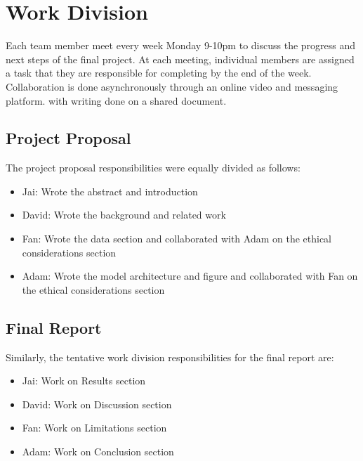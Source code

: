 \documentclass[../main.tex]{subfiles}
\begin{document}
\section{Work Division} 
Each team member meet every week Monday 9-10pm to 
discuss the progress and next steps of the final project. At each meeting, 
individual members are assigned a task that they are responsible for completing 
by the end of the week. Collaboration is done asynchronously through an online 
video and messaging platform. with writing done on a shared document.

\subsection{Project Proposal} 
The project proposal responsibilities were equally divided as follows:

\begin{itemize} 
  \item Jai: Wrote the abstract and introduction 
  \item David: Wrote the background and related work 
  \item Fan: Wrote the data section and collaborated with Adam on the ethical considerations section
  \item Adam: Wrote the model architecture and figure and collaborated with Fan on the ethical considerations section
\end{itemize}

\subsection{Final Report} 

Similarly, the tentative work division responsibilities for the final report are:

\begin{itemize} 
  \item Jai: Work on Results section
  \item David: Work on Discussion section
  \item Fan: Work on Limitations section
  \item Adam: Work on Conclusion section
\end{itemize}
\end{document}
